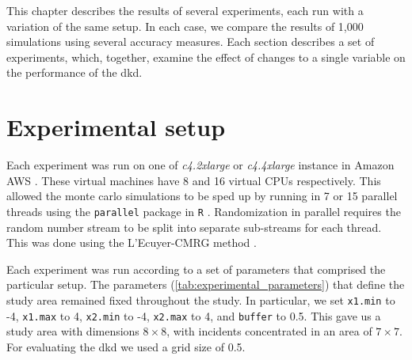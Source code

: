 

This chapter describes the results of several experiments, each run with a variation of the same setup.
In each case, we compare the results of 1,000 simulations using several accuracy measures.
Each section describes a set of experiments, which, together, examine the effect of changes to a single variable on the performance of the \gls{dkd}.

\section{Experimental setup}
\label{sec:results:setup}

Each experiment was run on one of \textit{c4.2xlarge} or \textit{c4.4xlarge} instance in Amazon AWS \citep{aws:instancetypes}.
These virtual machines have 8 and 16 virtual CPUs respectively.
This allowed the monte carlo simulations to be sped up by running in 7 or 15 parallel threads using the \texttt{parallel} package in \texttt{R} \citep{r:parallel}.
Randomization in parallel requires the random number stream to be split into separate sub-streams for each thread. 
This was done using the L'Ecuyer-CMRG method \citep{lecuyer2002random}.

Each experiment was run according to a set of parameters that comprised the particular setup.
The parameters (\cref{tab:experimental_parameters}) that define the study area remained fixed throughout the study.
In particular, we set \texttt{x1.min} to -4, \texttt{x1.max} to 4, \texttt{x2.min} to -4, \texttt{x2.max} to 4, and \texttt{buffer} to 0.5.
This gave us a study area with dimensions $8 \times 8$, with incidents concentrated in an area of $7 \times 7$.
For evaluating the \gls{dkd} we used a grid size of 0.5.

